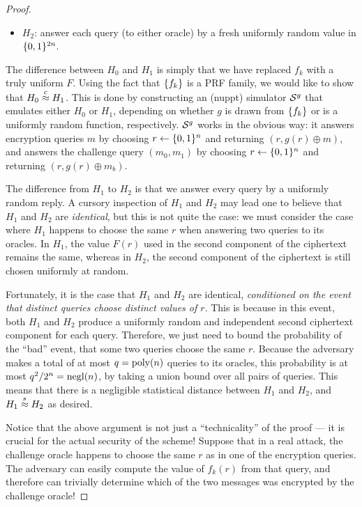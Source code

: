 \documentclass[11pt]{article}
\begin{document}
\begin{proof}
\begin{itemize}
  \item $H_{2}$: answer each query (to either oracle) by a fresh
    uniformly random value in $\{0,1\}^{2n}$.
  \end{itemize}

  The difference between $H_{0}$ and $H_{1}$ is simply that we have
  replaced $f_{k}$ with a truly uniform $F$.  Using the fact that
  $\{f_{k}\}$ is a PRF family, we would like to show that $H_{0}
  \stackrel{c}{\approx} H_{1}$.  This is done by constructing an (nuppt) simulator
  $\mathcal{S}^{g}$ that emulates either $H_{0}$ or $H_{1}$, depending on
  whether $g$ is drawn from $\{f_{k}\}$ or is a uniformly random
  function, respectively.  $\mathcal{S}^{g}$ works in the obvious way: it
  answers encryption queries $m$ by choosing $r \gets \{0,1\}^{n}$ and
  returning $(r, g(r) \oplus m)$, and answers the challenge query
  $(m_{0}, m_{1})$ by choosing $r \gets \{0,1\}^{n}$ and returning $(r,
  g(r) \oplus m_{b})$.

  The difference from $H_{1}$ to $H_{2}$ is that we answer every query
  by a uniformly random reply.  A cursory inspection of $H_{1}$ and
  $H_{2}$ may lead one to believe that $H_{1}$ and $H_{2}$ are
  \emph{identical}, but this is not quite the case: we must consider
  the case where $H_{1}$ happens to choose the same $r$ when answering
  two queries to its oracles.  In $H_{1}$, the value $F(r)$ used in
  the second component of the ciphertext remains the same, whereas in
  $H_{2}$, the second component of the ciphertext is still chosen
  uniformly at random.

  Fortunately, it is the case that $H_{1}$ and $H_{2}$ are identical,
  \emph{conditioned on the event that distinct queries choose distinct
    values of $r$}.  This is because in this event, both $H_{1}$ and
  $H_{2}$ produce a uniformly random and independent second ciphertext
  component for each query.  Therefore, we just need to bound the
  probability of the ``bad'' event, that some two queries choose the
  same $r$.  Because the adversary makes a total of at most $q =
  \operatorname{poly}(n)$ queries to its oracles, this probability is at most
  $q^{2}/2^{n} = \operatorname{negl}(n)$, by taking a union bound over all pairs of
  queries.  This means that there is a negligible statistical distance
  between $H_{1}$ and $H_{2}$, and $H_{1} \stackrel{s}{\approx} H_{2}$ as desired.

  Notice that the above argument is not just a ``technicality'' of the
  proof --- it is crucial for the actual security of the scheme!
  Suppose that in a real attack, the challenge oracle happens to
  choose the same $r$ as in one of the encryption queries.  The
  adversary can easily compute the value of $f_{k}(r)$ from that
  query, and therefore can trivially determine which of the two
  messages was encrypted by the challenge oracle!
\end{proof}
\end{document}
